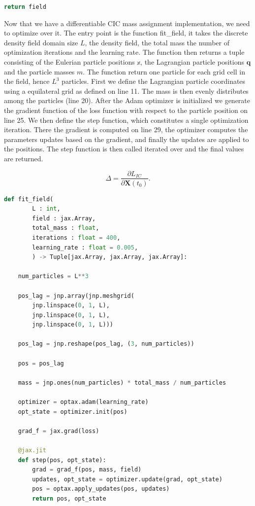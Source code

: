 \documentclass{article}
\begin{document}
{\begin{appendices}
\begin{lstlisting}[language=Python]
    return field
\end{lstlisting}

Now that we have a differentiable CIC mass assignment implementation, we need to optimize over it. The entry point is the function fit\_field, it takes the discrete density field domain size $L$, the density field, the total mass the number of optimization iterations and the learning rate. The function then returns a tuple consisting of the Eulerian particle positions $\mathbb{x}$, the Lagrangian particle positions $\mathbf{q}$ and the particle masses $m$. The function return one particle for each grid cell in the field, hence $L^3$ particles.
First we define the Lagrangian particle coordinates using a equilateral grid as defined on line 11. The mass is then evenly distributes among the particles (line 20). After the Adam optimizer is initialized we generate the gradient function of the loss function with respect to the particle position on line 25. We then define the step function, which constitutes a single optimization iteration. There the gradient is computed on line 29, the optimizer computes the parameters updates based on the gradient, and finally the updates are applied to the positions. The step function is then called iterated over and the final values are returned.

\begin{equation}
    \Delta = \frac{\partial L_{IC}}{\partial \mathbf{X}(t_0)}.
\end{equation}


\begin{lstlisting}[language=Python]
def fit_field(
        L : int,
        field : jax.Array,
        total_mass : float,
        iterations : float = 400,
        learning_rate : float = 0.005,
        ) -> Tuple[jax.Array, jax.Array, jax.Array]:

    num_particles = L**3

    pos_lag = jnp.array(jnp.meshgrid(
        jnp.linspace(0, 1, L),
        jnp.linspace(0, 1, L),
        jnp.linspace(0, 1, L)))

    pos_lag = jnp.reshape(pos_lag, (3, num_particles))

    pos = pos_lag

    mass = jnp.ones(num_particles) * total_mass / num_particles

    optimizer = optax.adam(learning_rate)
    opt_state = optimizer.init(pos)

    grad_f = jax.grad(loss)

    @jax.jit
    def step(pos, opt_state):
        grad = grad_f(pos, mass, field)
        updates, opt_state = optimizer.update(grad, opt_state)
        pos = optax.apply_updates(pos, updates)
        return pos, opt_state
    

\end{lstlisting}
\end{appendices}}
\end{document}
